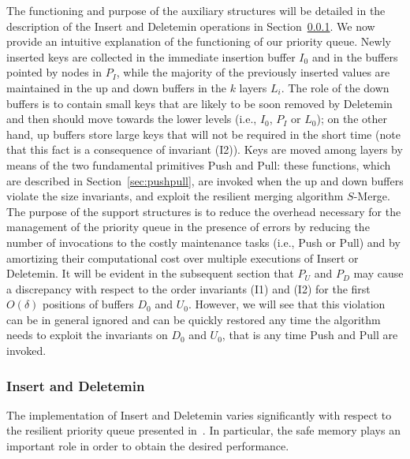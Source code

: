 \documentclass[review,number]{elsarticle}
\newcommand{\BO}[1]{{O}\left(#1\right)}
\newcommand{\SMerge}{$S$-\textsf{Merge}}
\newcommand{\Insert}{\textsf{Insert}}
\newcommand{\Deletemin}{\textsf{Deletemin}}
\newcommand{\Push}{\textsf{Push}}
\newcommand{\Pull}{\textsf{Pull}}
\begin{document}
The functioning and purpose of the auxiliary structures will
be detailed in the description  of the \Insert{} and \Deletemin{} operations in
Section~\ref{sec:insdel}.
We now provide an intuitive explanation of the
functioning of our priority queue. Newly inserted keys are collected in the
immediate insertion buffer $I_0$ and in the buffers pointed by nodes in $P_I$,
while 
the majority of the previously inserted values are maintained in the
up and down buffers in the $k$ layers $L_i$. 
The role of the down buffers is to contain small keys that are likely to be soon
removed by \Deletemin{} and then should move towards the lower levels (i.e.,
$I_0$, $P_I$ or $L_0$); on
the other hand, up buffers store large keys that will not be required in the
short time (note that this fact is a consequence of invariant (I2)).
Keys  are moved among
layers by means of the two fundamental primitives \Push{} and \Pull{}: these
functions, which are described in Section~\ref{sec:pushpull}, are invoked when
the up and down buffers violate the size invariants, and exploit the resilient
merging algorithm \SMerge{}. 
The purpose of the support structures is to reduce
the overhead necessary for the management of the priority queue in the presence
of errors by reducing the number of invocations to the costly
maintenance tasks (i.e., \Push{} or \Pull{}) and by amortizing their
computational cost over multiple executions of \Insert{} or \Deletemin{}.
It will be evident in the subsequent section that $P_U$ and $P_D$ may
cause a discrepancy with respect to the order invariants (I1) and (I2) for
the first $\BO{\delta}$ positions of buffers $D_{0}$ and $U_{0}$. However, we
will see that this violation can be in general ignored and can be quickly
restored any time the algorithm needs 
to exploit the invariants on $D_{0}$ and $U_{0}$, that is any time  \Push{} and
\Pull{} are invoked.



\subsubsection{\Insert{} and \Deletemin{}}\label{sec:insdel}
The implementation of \Insert{} and \Deletemin{} varies significantly with
respect to the resilient priority queue presented in~\cite{JMM07}. In
particular, the safe memory plays an important role  in order to
obtain the desired performance. 
\end{document}
